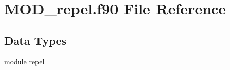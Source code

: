 \hypertarget{MOD__repel_8f90}{\section{M\-O\-D\-\_\-repel.\-f90 File Reference}
\label{MOD__repel_8f90}
}
\subsection*{Data Types}
\begin{DoxyCompactItemize}
\item 
module \hyperlink{classrepel}{repel}
\end{DoxyCompactItemize}
